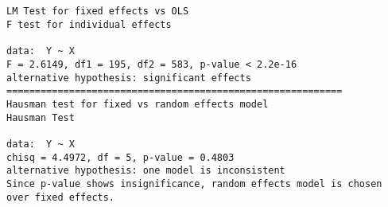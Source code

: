 \documentclass{article}
\begin{document}
\newpage
\begin{verbatim}


LM Test for fixed effects vs OLS
F test for individual effects

data:  Y ~ X
F = 2.6149, df1 = 195, df2 = 583, p-value < 2.2e-16
alternative hypothesis: significant effects
===========================================================
Hausman test for fixed vs random effects model
Hausman Test

data:  Y ~ X
chisq = 4.4972, df = 5, p-value = 0.4803
alternative hypothesis: one model is inconsistent
Since p-value shows insignificance, random effects model is chosen over fixed effects.
\end{verbatim}




\newpage
\end{document}
